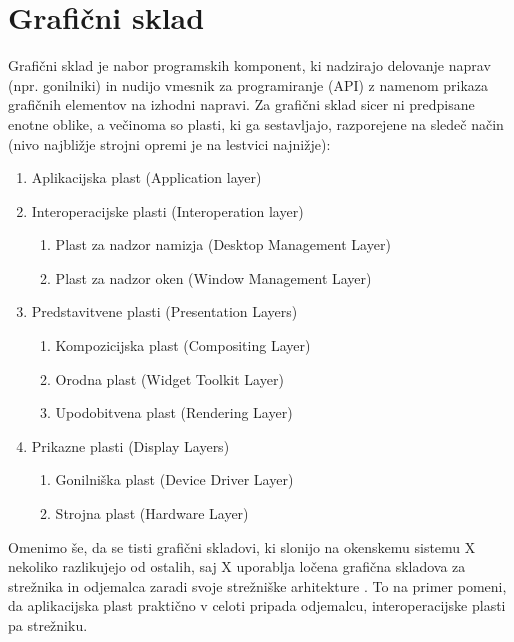 \documentclass{article}
\begin{document}
\section{Grafični sklad}
Grafični sklad\autocite{osdev} je nabor programskih komponent, ki nadzirajo delovanje naprav (npr. gonilniki) in nudijo vmesnik za programiranje (API) z namenom prikaza grafičnih elementov na izhodni napravi.
Za grafični sklad sicer ni predpisane enotne oblike, a večinoma so plasti, ki ga sestavljajo, razporejene na sledeč način (nivo najbližje strojni opremi je na lestvici najnižje):

\begin{enumerate}
    \item Aplikacijska plast (Application layer)
    \item Interoperacijske plasti (Interoperation layer)
        \begin{enumerate}[label*=\arabic*.]
            \item Plast za nadzor namizja (Desktop Management Layer)
            \item Plast za nadzor oken (Window Management Layer)
        \end{enumerate}
    \item Predstavitvene plasti (Presentation Layers)
        \begin{enumerate}[label*=\arabic*.]
            \item Kompozicijska plast (Compositing Layer)
            \item Orodna plast (Widget Toolkit Layer)
            \item Upodobitvena plast (Rendering Layer)
        \end{enumerate}
    \item Prikazne plasti (Display Layers)
        \begin{enumerate}[label*=\arabic*.]
            \item Gonilniška plast (Device Driver Layer)
            \item Strojna plast (Hardware Layer)
        \end{enumerate}
\end{enumerate}

Omenimo še, da se tisti grafični skladovi, ki slonijo na okenskemu sistemu X nekoliko razlikujejo od ostalih, saj X uporablja ločena grafična skladova za strežnika in odjemalca zaradi svoje strežniške arhitekture \autocite{osdev}. To na primer pomeni, da aplikacijska plast praktično v celoti pripada odjemalcu, interoperacijske plasti pa strežniku.
\end{document}
